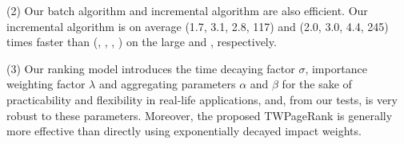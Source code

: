 \sstab(2) Our batch algorithm \batensemble and incremental algorithm \incensemble are also efficient.
%
Our incremental algorithm \incensemble is on average (1.7, 3.1, 2.8, 117) and (2.0, 3.0, 4.4, 245) times faster than (\batensemble, \powensemble, \futurerank, \hhgrank)  on the large \aminer and \magdata, respectively.




\sstab(3) Our ranking model \ensemblerank introduces the time decaying factor $\sigma$, importance weighting factor $\lambda$ and aggregating parameters $\alpha$ and $\beta$ for the sake of practicability and flexibility in real-life applications, and, from our tests, \ensemblerank is very robust to these parameters. Moreover, the proposed TWPageRank is generally more effective than directly using exponentially decayed impact weights.



